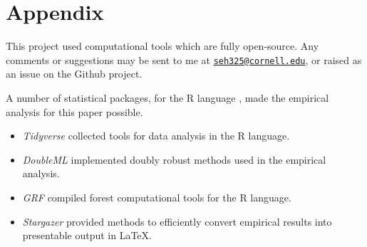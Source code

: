 \appendix
\setcounter{table}{0}
\renewcommand{\thetable}{A\arabic{table}}
\setcounter{figure}{0}
\renewcommand{\thefigure}{A\arabic{figure}}

\section{Appendix}
\label{appendix}
This project used computational tools which are fully open-source.
Any comments or suggestions may be sent to me at \href{mailto:seh325@cornell.edu}{\nolinkurl{seh325@cornell.edu}}, or raised as an issue on the Github project.

A number of statistical packages, for the R language \citep{R2023}, made the empirical analysis for this paper possible.
\begin{itemize}
    \item \textit{Tidyverse} \citep{tidyverse} collected tools for data analysis in the R language.
    \item \textit{DoubleML} \citep{DoubleML2020} implemented doubly robust methods used in the empirical analysis. 
    \item \textit{GRF} \citep{athey2019generalized,grf} compiled forest computational tools for the R language.
    \item \textit{Stargazer} \citep{stargazer} provided methods to efficiently convert empirical results into presentable output in \LaTeX.
\end{itemize}

